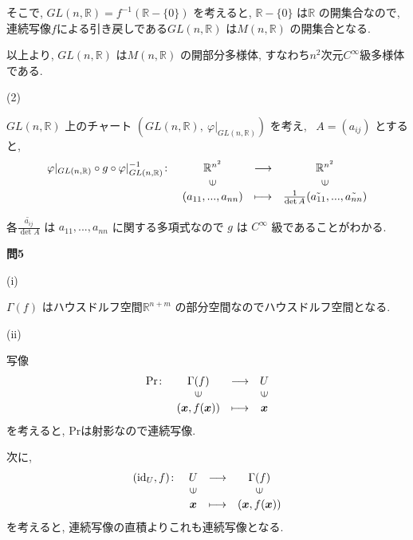\documentclass[dvipdfmx]{jsarticle}
\DeclareMathOperator{\id}{id} %
\begin{document}
そこで, $GL(n, \mathbb{R}) = f^{-1}(\mathbb{R}-\{0\})$ を考えると, $\mathbb{R}-\{0\}$ は$\mathbb{R}$ の開集合なので, 連続写像$f$による引き戻しである$GL(n, \mathbb{R})$ は$M(n, \mathbb{R})$ の開集合となる. 

以上より, $GL(n, \mathbb{R})$ は$M(n, \mathbb{R})$ の開部分多様体, すなわち$n^2$次元$C^{\infty}$級多様体である.

\bigskip

(2)

$GL(n, \mathbb{R})$ 上のチャート $(GL(n, \mathbb{R}), \ \varphi |_{GL(n, \mathbb{R})})$ を考え, \ $A = (a_{ij})$ とすると, \ 
\[\begin{array}{rccc}
\varphi |_{GL(n, \mathbb{R})} \circ g \circ \varphi |_{GL(n, \mathbb{R})}^{-1}
 \colon & \mathbb{R}^{n^2} & \longrightarrow & \mathbb{R}^{n^2} \\
        & \rotatebox{90}{$\in$} & & \rotatebox{90}{$\in$} \\
      & (a_{11}, ..., a_{nn}) & \longmapsto & \frac{1}{\det A} (\tilde{a_{11}} , ..., \tilde{a_{nn}}) 
\end{array}\]

各$\displaystyle \frac{\tilde{a_{ij}}}{\det A}$ は $a_{11}, ..., a_{nn}$ に関する多項式なので $g$ は $C^{\infty}$ 級であることがわかる.

\bigskip

\textbf{問5}

(i) 

$\Gamma(f)$ はハウスドルフ空間$\mathbb{R}^{n+m}$ の部分空間なのでハウスドルフ空間となる.

\bigskip

(ii)

写像
\[\begin{array}{rccc}
\Pr \colon & \Gamma(f) & \longrightarrow & U \\
        & \rotatebox{90}{$\in$} & & \rotatebox{90}{$\in$} \\
        & (\bm{x}, f(\bm{x})) & \longmapsto & \bm{x}
\end{array}\]
を考えると, Prは射影なので連続写像.

次に, 
\[\begin{array}{rccc}
(\id_U, f) \colon & U & \longrightarrow & \Gamma(f) \\
        & \rotatebox{90}{$\in$} & & \rotatebox{90}{$\in$} \\
        & \bm{x} & \longmapsto & (\bm{x}, f(\bm{x}))
\end{array}\]
を考えると, 連続写像の直積よりこれも連続写像となる.
\end{document}
